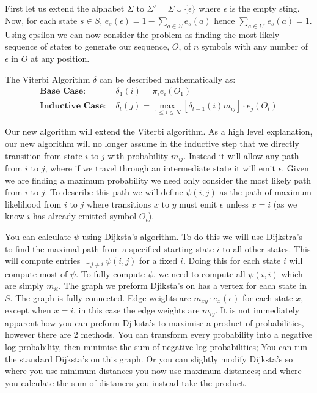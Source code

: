 \subsection{}
First let us extend the alphabet $\Sigma$ to $\Sigma' = \Sigma \cup \{\epsilon\}$ where $\epsilon$ is the empty sting. Now, for each state $s\in S$, $e_s(\epsilon) = 1 - \sum_{a\in \Sigma} e_s(a)$ hence $\sum_{a\in \Sigma'} e_s(a) = 1$. Using epsilon we can now consider the problem as finding the most likely sequence of states to generate our sequence, $O$, of $n$ symbols with any number of $\epsilon$ in $O$ at any position.

The Viterbi Algorithm $\delta$ can be described mathematically as:
\begin{align*}
\textbf{Base Case: } &\delta_1(i) = \pi_i e_i(O_1)\\
\textbf{Inductive Case: } &\delta_t(j) = \max_{1\leq i \leq N}[\delta_{t-1}(i)m_{ij}]\cdot e_j(O_t)
\end{align*}

Our new algorithm will extend the Viterbi algorithm. As a high level explanation, our new algorithm will no longer assume in the inductive step that we directly transition from state $i$ to $j$ with probability $m_{ij}$. Instead it will allow any path from $i$ to $j$, where if we travel through an intermediate state it will emit $\epsilon$. Given we are finding a maximum probability we need only consider the most likely path from $i$ to $j$. To describe this path we will define $\psi(i,j)$ as the path of maximum likelihood from $i$ to $j$ where transitions $x$ to $y$ must emit $\epsilon$ unless $x=i$ (as we know $i$ has already emitted symbol $O_t$).

You can calculate $\psi$ using Dijksta's algorithm. To do this we will use Dijkstra's to find the maximal path from a specified starting state $i$ to all other states. 
This will compute entries $\cup_{j \neq i} \psi(i,j)$ for a fixed $i$. Doing this for each state $i$ will compute most of $\psi$. To fully compute $\psi$, we need to compute all $\psi(i,i)$ which are simply $m_{ii}$.
The graph we preform Djiksta's on has a vertex for each state in $S$. 
The graph is fully connected. 
Edge weights are $m_{xy}\cdot e_x(\epsilon)$ for each state $x$, except when $x=i$, in this case the edge weights are $m_{iy}$.
It is not immediately apparent how you can preform Djiksta's to maximise a product of probabilities, however there are 2 methods.
You can transform every probability into a negative log probability, then minimise the sum of negative log probabilities; You can run the standard Dijksta's on this graph. 
Or you can slightly modify Dijksta's so where you use minimum distances you now use maximum distances; and where you calculate the sum of distances you instead take the product.

